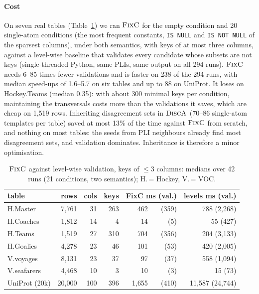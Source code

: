 \documentclass[conference]{IEEEtran}
\theoremstyle{definition}
\begin{document}
\paragraph*{Cost} On seven real tables (Table~\ref{tab:bench}) we ran $\textsc{FixC}$ for the empty
condition and 20 single-atom conditions (the most frequent constants, \texttt{IS NULL} and
\texttt{IS NOT NULL} of the sparsest columns), under both semantics, with keys of at most three
columns, against a level-wise baseline that validates every candidate whose subsets are not keys
(single-threaded Python, same PLIs, same output on all 294 runs). $\textsc{FixC}$ needs 6--85 times
fewer validations and is faster on 238 of the 294 runs, with median speed-ups of 1.6--5.7 on six
tables and up to 88 on UniProt. It loses on Hockey.Teams (median 0.35): with about 300 minimal keys
per condition, maintaining the transversals costs more than the validations it saves, which are
cheap on 1{,}519 rows. Inheriting disagreement sets in $\textsc{DiscA}$ (70--86 single-atom
templates per table) saved at most 13\% of the time against $\textsc{FixC}$ from scratch, and nothing
on most tables: the seeds from PLI neighbours already find most disagreement sets, and validation
dominates. Inheritance is therefore a minor optimisation.
\begin{table}[t]\centering\small\setlength{\tabcolsep}{3pt}
\caption{$\textsc{FixC}$ against level-wise validation, keys of $\le3$ columns: medians over 42 runs (21 conditions, two semantics); H.\,= Hockey, V.\,= VOC.}\label{tab:bench}
\begin{tabular}{@{}lrrrrrr@{}}\toprule
table & rows & cols & keys & \multicolumn{2}{c}{FixC ms (val.)} & levels ms (val.)\\\midrule
H.Master & 7{,}761 & 31 & 263 & 462 & (359) & 788 (2{,}268)\\
H.Coaches & 1{,}812 & 14 & 4 & 14 & (5) & 55 (427)\\
H.Teams & 1{,}519 & 27 & 310 & 704 & (356) & 204 (3{,}133)\\
H.Goalies & 4{,}278 & 23 & 46 & 101 & (53) & 420 (2{,}005)\\
V.voyages & 8{,}131 & 23 & 37 & 97 & (37) & 558 (1{,}094)\\
V.seafarers & 4{,}468 & 10 & 3 & 10 & (3) & 15 (73)\\
UniProt (20k) & 20{,}000 & 100 & 396 & 1{,}655 & (410) & 11{,}587 (24{,}744)\\\bottomrule
\end{tabular}\end{table}
\end{document}
